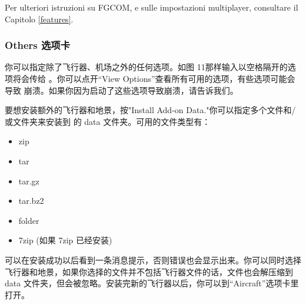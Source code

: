 \begin{itemize}
{Per ulteriori istruzioni su FGCOM, e sulle impostazioni multiplayer, consultare il Capitolo \ref{features}.
}{}

\ifchinese
\subsubsection{Others 选项卡}
你可以指定除了飞行器、机场之外的任何选项。如图 11那样输入以空格隔开的选项将会传给 \FlightGear{}。你可以点开“View Options”查看所有可用的选项，有些选项可能会导致 \FlightGear{} 崩溃。如果你因为启动了这些选项导致崩溃，请告诉我们。

要想安装额外的飞行器和地景，按"Install Add-on Data."你可以指定多个文件和/或文件夹来安装到 \FlightGear{} 的 data 文件夹。可用的文件类型有：
\begin{itemize}
\item zip
\item tar
\item tar.gz
\item tar.bz2
\item folder
\item 7zip (如果 7zip 已经安装)
\end{itemize}

可以在安装成功以后看到一条消息提示，否则错误也会显示出来。你可以同时选择飞行器和地景，如果你选择的文件并不包括飞行器文件的话，文件也会解压缩到 data 文件夹，但会被忽略。安装完新的飞行器以后，你可以到``Aircraft''选项卡里打开。
\fi
%
%
\end{itemize}

